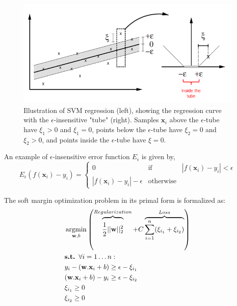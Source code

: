 \begin{figure}[h!]
\centering
\includegraphics[width=0.7\linewidth]{images/SVR_tube}
\caption{Illustration of SVM regression (left), showing the regression curve with the $\epsilon$-insensitive "tube" (right). Samples $\textbf{x}_i$ above the $\epsilon$-tube have $\xi_1 > 0$ and $\xi_1 = 0$, points below the $\epsilon$-tube have $\xi_2 = 0$ and $\xi_2 > 0$, and points inside the $\epsilon$-tube have $\xi = 0$.}
\label{fig:SVR_tube}
\end{figure}

\noindent An example of $\epsilon$-insensitive error function $E_{\epsilon}$ is given by,
\begin{equation}
E_{\epsilon} (f(\textbf{x}_i)-y_i) =
\left\lbrace
\begin{array}{lll}
0  								& \mbox{if} 		& |f(\textbf{x}_i)-y_i| < \epsilon\\
|f(\textbf{x}_i)-y_i|-\epsilon 	& \mbox{otherwise}  & 
\end{array}\right.
\end{equation}


\noindent The soft margin optimization problem in its primal form is formalized as:
	\begin{align}
		& \argmin_{\textbf{w},b}  \left( 
		\overbrace{\vphantom{\sum_{i=1}^n \xi_i}
			\frac{1}{2}||\textbf{w}||^2_2}^{Regularization}
		+ C \overbrace{\sum\limits_{i=1}^{n}(\xi_{i_1}+\xi_{i_2})}^{Loss}
		\right) 
		\label{eq:objectiveSVR}\\
		& \textbf{s.t. } \forall i=1 \ldots n:\\
		& y_i-(\textbf{w}.\textbf{x}_i+b) \geq \epsilon -\xi_{i_1} \\
		& (\textbf{w}.\textbf{x}_i+b)-y_i \geq \epsilon -\xi_{i_2} \\
		&  \xi_{i_1} \geq 0 \\
		&  \xi_{i_2} \geq 0 \\
	\end{align}

